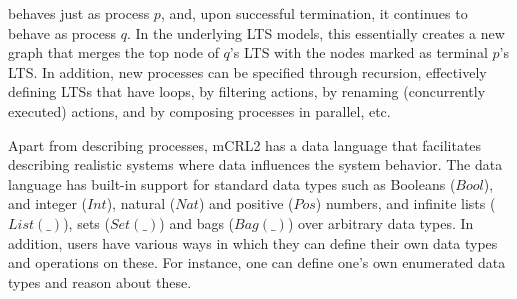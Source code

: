 \documentclass[sort&compress,preprint,3p]{elsarticle}
\begin{document}
behaves just as process \begin{math}p\end{math}, and, upon successful
termination, it continues to behave as process \begin{math}q\end{math}.
In the underlying LTS models, this essentially creates a new graph that merges the
top node of \begin{math}q\end{math}'s LTS with the
nodes marked as terminal \begin{math}p\end{math}'s LTS.
In addition, new processes can be specified through recursion,
effectively defining LTSs that have loops, by filtering actions, by
renaming (concurrently executed) actions, and by composing processes in
parallel, etc.


Apart from describing processes, mCRL2 has a data language that
facilitates describing realistic systems where data influences the
system behavior.  The data language has built-in support for standard
data types such as Booleans (\begin{math}Bool\end{math}), and integer
(\begin{math}Int\end{math}), natural (\begin{math}Nat\end{math})
and positive (\begin{math}Pos\end{math}) numbers, and infinite lists
(\begin{math}List(\_)\end{math}), sets (\begin{math}Set(\_)\end{math})
and bags (\begin{math}Bag(\_)\end{math}) over arbitrary data types. In
addition, users have various ways in which they can define their own
data types and operations on these. For instance, one can define one's
own enumerated data types and reason about these.
\end{document}
